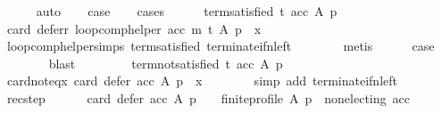 \begin{isabellebody}
\ \ \ \ \isamarkupfalse%
\ auto\isanewline
\ \ \isamarkupfalse%
\ {\isacharquery}{\kern0pt}case\isanewline
\ \ \isamarkupfalse%
\ cases\isanewline
\ \ \ \ \isamarkupfalse%
\ term{\isacharunderscore}{\kern0pt}satisfied{\isacharcolon}{\kern0pt}\ {\isachardoublequoteopen}t\ {\isacharparenleft}{\kern0pt}acc\ A\ p{\isacharparenright}{\kern0pt}{\isachardoublequoteclose}\isanewline
\ \ \ \ \isamarkupfalse%
\ {\isachardoublequoteopen}card\ {\isacharparenleft}{\kern0pt}defer{\isacharunderscore}{\kern0pt}r\ {\isacharparenleft}{\kern0pt}loop{\isacharunderscore}{\kern0pt}comp{\isacharunderscore}{\kern0pt}helper\ acc\ m\ t\ A\ p{\isacharparenright}{\kern0pt}{\isacharparenright}{\kern0pt}\ {\isacharequal}{\kern0pt}\ x{\isachardoublequoteclose}\isanewline
\ \ \ \ \ \ \isamarkupfalse%
\ loop{\isacharunderscore}{\kern0pt}comp{\isacharunderscore}{\kern0pt}helper{\isachardot}{\kern0pt}simps{\isacharparenleft}{\kern0pt}{}{\isacharparenright}{\kern0pt}\ term{\isacharunderscore}{\kern0pt}satisfied\ terminate{\isacharunderscore}{\kern0pt}if{\isacharunderscore}{\kern0pt}n{\isacharunderscore}{\kern0pt}left\isanewline
\ \ \ \ \ \ \isamarkupfalse%
\ metis\isanewline
\ \ \ \ \isamarkupfalse%
\ {\isacharquery}{\kern0pt}case\isanewline
\ \ \ \ \ \ \isamarkupfalse%
\ blast\isanewline
\ \ \isamarkupfalse%
\isanewline
\ \ \ \ \isamarkupfalse%
\ term{\isacharunderscore}{\kern0pt}not{\isacharunderscore}{\kern0pt}satisfied{\isacharcolon}{\kern0pt}\ {\isachardoublequoteopen}{\isasymnot}{\isacharparenleft}{\kern0pt}t\ {\isacharparenleft}{\kern0pt}acc\ A\ p{\isacharparenright}{\kern0pt}{\isacharparenright}{\kern0pt}{\isachardoublequoteclose}\isanewline
\ \ \ \ \isamarkupfalse%
\ card{\isacharunderscore}{\kern0pt}not{\isacharunderscore}{\kern0pt}eq{\isacharunderscore}{\kern0pt}x{\isacharcolon}{\kern0pt}\ {\isachardoublequoteopen}card\ {\isacharparenleft}{\kern0pt}defer\ acc\ A\ p{\isacharparenright}{\kern0pt}\ {\isasymnoteq}\ x{\isachardoublequoteclose}\isanewline
\ \ \ \ \ \ \isamarkupfalse%
\ {\isacharparenleft}{\kern0pt}simp\ add{\isacharcolon}{\kern0pt}\ terminate{\isacharunderscore}{\kern0pt}if{\isacharunderscore}{\kern0pt}n{\isacharunderscore}{\kern0pt}left{\isacharparenright}{\kern0pt}\isanewline
\ \ \ \ \isamarkupfalse%
\ rec{\isacharunderscore}{\kern0pt}step{\isacharcolon}{\kern0pt}\isanewline
\ \ \ \ \ \ {\isachardoublequoteopen}{\isacharparenleft}{\kern0pt}card\ {\isacharparenleft}{\kern0pt}defer\ acc\ A\ p{\isacharparenright}{\kern0pt}\ {\isachargreater}{\kern0pt}\ {}\ {\isasymand}\ finite{\isacharunderscore}{\kern0pt}profile\ A\ p\ {\isasymand}\ non{\isacharunderscore}{\kern0pt}electing\ acc{\isacharparenright}{\kern0pt}\ {\isasymlongrightarrow}\isanewline

\end{isabellebody}
